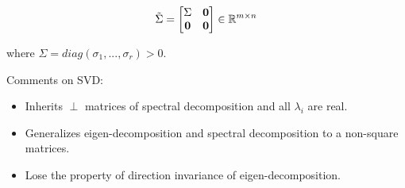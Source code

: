$$\tilde{\Sigma} = 
\left[
\begin{matrix}
\Sigma & \textbf{0}\\
\textbf{0}&\textbf{0}
\end{matrix}
\right]\in \mathbb{R}^{m\times n}
$$

where $\Sigma = diag(\sigma_1,...,\sigma_r)> 0$.


Comments on SVD: 
\begin{itemize}
	\item Inherits $\perp$ matrices of spectral decomposition and all $\lambda_i$ are real.
	\item Generalizes eigen-decomposition and spectral decomposition to a non-square matrices.
	\item Lose the property of direction invariance of eigen-decomposition.
\end{itemize}


